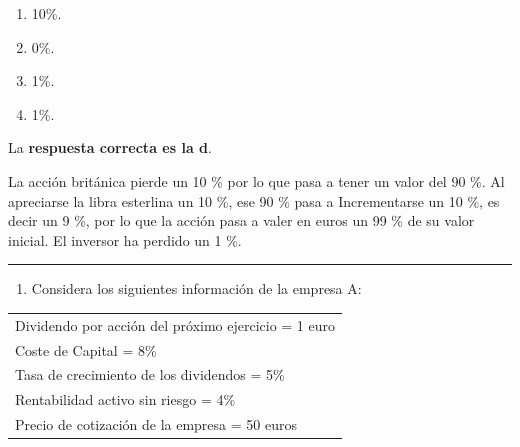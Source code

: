 \documentclass[
  letterpaper,
  DIV=11,
  numbers=noendperiod]{scrreprt}
\providecommand{\tightlist}{%
  \setlength{\itemsep}{0pt}\setlength{\parskip}{0pt}}\usepackage{longtable,booktabs,array}
\begin{document}
\begin{enumerate}
\def\labelenumi{\alph{enumi}.}
\item
  10\%.
\item
  0\%.
\item
  1\%.
\item
  1\%.
\end{enumerate}

\begin{tcolorbox}[enhanced jigsaw, left=2mm, opacityback=0, colback=white, breakable, arc=.35mm, bottomrule=.15mm, rightrule=.15mm, toprule=.15mm, leftrule=.75mm, colframe=quarto-callout-tip-color-frame]
\begin{minipage}[t]{5.5mm}
\textcolor{quarto-callout-tip-color}{\faLightbulb}
\end{minipage}%
\begin{minipage}[t]{\textwidth - 5.5mm}

La \textbf{respuesta correcta es la d}.

La acción británica pierde un 10 \% por lo que pasa a tener un valor del
90 \%. Al apreciarse la libra esterlina un 10 \%, ese 90 \% pasa a
Incrementarse un 10 \%, es decir un 9 \%, por lo que la acción pasa a
valer en euros un 99 \% de su valor inicial. El inversor ha perdido un 1
\%.

\end{minipage}%
\end{tcolorbox}

\begin{center}\rule{0.5\linewidth}{0.5pt}\end{center}

\begin{enumerate}
\def\labelenumi{\arabic{enumi}.}
\setcounter{enumi}{78}
\tightlist
\item
  Considera los siguientes información de la empresa A:
\end{enumerate}

\begin{longtable}[]{@{}l@{}}
\toprule()
\endhead
Dividendo por acción del próximo ejercicio = 1 euro \\
Coste de Capital = 8\% \\
Tasa de crecimiento de los dividendos = 5\% \\
Rentabilidad activo sin riesgo = 4\% \\
Precio de cotización de la empresa = 50 euros \\
\bottomrule()
\end{longtable}
\end{document}
